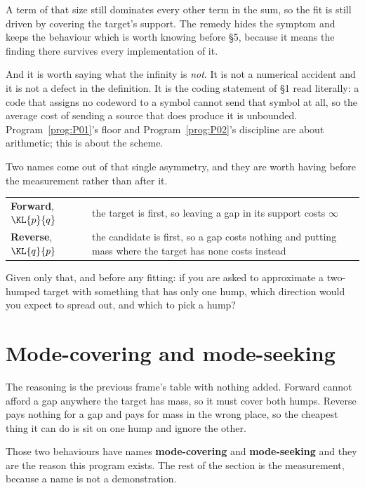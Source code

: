 \begin{fr}

A term of that size still dominates every other term in the sum, so the fit
is still driven by covering the target's support. The remedy hides the
symptom and keeps the behaviour \dash{} which is worth knowing before §5,
because it means the finding there survives every implementation of it.

And it is worth saying what the infinity is \emph{not}. It is not a
numerical accident and it is not a defect in the definition. It is the coding
statement of §1 read
literally: a code that assigns no codeword to a symbol cannot send that
symbol at all, so the average cost of sending a source that does produce it
is unbounded. Program~\ref{prog:P01}'s floor and
Program~\ref{prog:P02}'s discipline are about arithmetic; this is about the
scheme.

\end{fr}

\begin{fr}
Two names come out of that single asymmetry, and they are worth having before
the measurement rather than after it.

\begin{center}
\begin{tabularx}{\linewidth}{@{}lX@{}}
\toprule
\textbf{Forward}, $\KL{p}{q}$ & the target is first, so leaving a gap in
its support costs $\infty$ \\
\textbf{Reverse}, $\KL{q}{p}$ & the candidate is first, so a gap costs
nothing and putting mass where the target has none costs instead \\
\bottomrule
\end{tabularx}
\end{center}

Given only that, and before any fitting: if you are asked to approximate a
two-humped target with something that has only one hump, which direction
would you expect to spread out, and which to pick a hump?
\dotline
\nextframe
\end{fr}

\section{Mode-covering and mode-seeking}
\label{sec:P30-modes}

\begin{fr}

The reasoning is the previous frame's table with nothing added. Forward
cannot afford a gap anywhere the target has mass, so it must cover both
humps. Reverse pays nothing for a gap and pays for mass in the wrong place,
so the cheapest thing it can do is sit on one hump and ignore the other.

Those two behaviours have names \dash{} \textbf{mode-covering} and
\textbf{mode-seeking} \dash{} and they are the reason this program exists.
The rest of the section is the measurement, because a name is not a
demonstration.
\end{fr}

